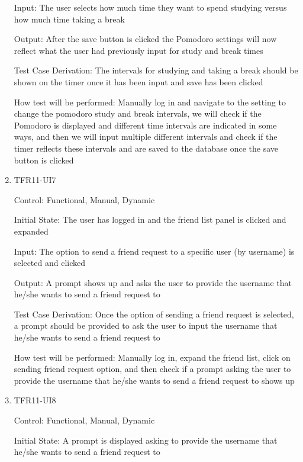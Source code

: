 \documentclass[12pt, titlepage]{article}
\begin{document}
\begin{enumerate}[resume]
  Input: The user selects how much time they want to spend studying versus how much time taking a break
            
  Output: After the save button is clicked the Pomodoro settings will now reflect what the user had previously input for study and break times
  
  Test Case Derivation: The intervals for studying and taking a break should be shown on the timer once it has been input and save has been clicked
            
  How test will be performed: Manually log in and navigate to the setting to change the pomodoro study and break intervals, we will check if the Pomodoro is displayed and different time intervals are indicated in some ways, and then we will input multiple different intervals and check if the timer reflects these intervals and are saved to the database once the save button is clicked 
  
  \item{TFR11-UI7\\}
  
  Control: Functional, Manual, Dynamic
            
  Initial State: The user has logged in and the friend list panel is clicked and expanded
            
  Input: The option to send a friend request to a specific user (by username) is selected and clicked 
            
  Output: A prompt shows up and asks the user to provide the username that he/she wants to send a friend request to
  
  Test Case Derivation: Once the option of sending a friend request is selected, a prompt should be provided to ask the user to input the username that he/she wants to send a friend request to
            
  How test will be performed: Manually log in, expand the friend list, click on sending friend request option, and then check if a prompt asking the user to provide the username that he/she wants to send a friend request to shows up
            
  \item{TFR11-UI8\\}
  
  Control: Functional, Manual, Dynamic
            
  Initial State: A prompt is displayed asking to provide the username that he/she wants to send a friend request to
            

\end{enumerate}
\end{document}
